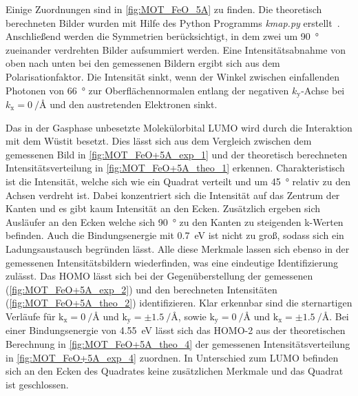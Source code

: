         Einige Zuordnungen sind in \autoref{fig:MOT_FeO_5A} zu finden.
        Die theoretisch berechneten Bilder wurden mit Hilfe des Python Programms \textit{kmap.py} erstellt~\cite{brandstetter_kmappy_2021}.
        Anschließend werden die Symmetrien berücksichtigt, in dem zwei um \SI{90}{\degree} zueinander verdrehten Bilder aufsummiert werden.
        Eine Intensitätsabnahme von oben nach unten bei den gemessenen Bildern ergibt sich aus dem Polarisationfaktor.
        Die Intensität sinkt, wenn der Winkel zwischen einfallenden Photonen von \SI{66}{\degree} zur Oberflächennormalen entlang der negativen $k_\text{y}$-Achse bei $k_\text{x} = \SI[per-mode=reciprocal]{0}{\per\angstrom}$ und den austretenden Elektronen sinkt.

        Das in der Gasphase unbesetzte Molekülorbital LUMO wird durch die Interaktion mit dem Wüstit besetzt.
        Dies lässt sich aus dem Vergleich zwischen dem gemessenen Bild in \autoref{fig:MOT_FeO+5A_exp_1} und der theoretisch berechneten Intensitätsverteilung in \autoref{fig:MOT_FeO+5A_theo_1} erkennen.
        Charakteristisch ist die Intensität, welche sich wie ein Quadrat verteilt und um \SI{45}{\degree} relativ zu den Achsen verdreht ist.
        Dabei konzentriert sich die Intensität auf das Zentrum der Kanten und es gibt kaum Intensität an den Ecken.
        Zusätzlich ergeben sich Ausläufer an den Ecken welche sich \SI{90}{\degree} zu den Kanten zu steigenden k-Werten befinden.
        Auch die Bindungsenergie mit \SI{0.7}{\electronvolt} ist nicht zu groß, sodass sich ein Ladungsaustausch begründen lässt.
        Alle diese Merkmale lassen sich ebenso in der gemessenen Intensitätsbildern wiederfinden, was eine eindeutige Identifizierung zulässt.
        Das HOMO lässt sich bei der Gegenüberstellung der gemessenen (\autoref{fig:MOT_FeO+5A_exp_2}) und den berechneten Intensitäten (\autoref{fig:MOT_FeO+5A_theo_2}) identifizieren.
        Klar erkennbar sind die sternartigen Verläufe für $\text{k}_\text{x} = \SI[per-mode=reciprocal]{0}{\per\angstrom}$ und $\text{k}_\text{y} = \pm\SI[per-mode=reciprocal]{1.5}{\per\angstrom}$, sowie $\text{k}_\text{y} = \SI[per-mode=reciprocal]{0}{\per\angstrom}$ und $\text{k}_\text{x} = \pm\SI[per-mode=reciprocal]{1.5}{\per\angstrom}$.
        Bei einer Bindungsenergie von \SI{4.55}{\electronvolt} lässt sich das HOMO-2 aus der theoretischen Berechnung in \autoref{fig:MOT_FeO+5A_theo_4} der gemessenen Intensitätsverteilung in \autoref{fig:MOT_FeO+5A_exp_4} zuordnen.
        In Unterschied zum LUMO befinden sich an den Ecken des Quadrates keine zusätzlichen Merkmale und das Quadrat ist geschlossen.
